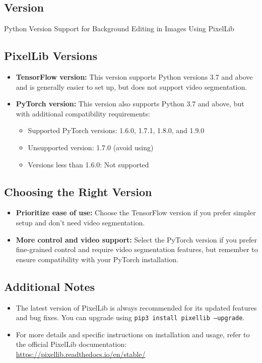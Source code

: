 \subsection{Version}
Python Version Support for Background Editing in Images Using PixelLib

\subsection*{PixelLib Versions}
\begin{itemize}[label=--]
    \item \textbf{TensorFlow version:} This version supports Python versions 3.7 and above and is generally easier to set up, but does not support video segmentation.
    \item \textbf{PyTorch version:} This version also supports Python 3.7 and above, but with additional compatibility requirements:
    \begin{itemize}[label=$\bullet$]
        \item Supported PyTorch versions: 1.6.0, 1.7.1, 1.8.0, and 1.9.0
        \item Unsupported version: 1.7.0 (avoid using)
        \item Versions less than 1.6.0: Not supported
    \end{itemize}
\end{itemize}

\subsection*{Choosing the Right Version}
\begin{itemize}[label=--]
    \item \textbf{Prioritize ease of use:} Choose the TensorFlow version if you prefer simpler setup and don't need video segmentation.
    \item \textbf{More control and video support:} Select the PyTorch version if you prefer fine-grained control and require video segmentation features, but remember to ensure compatibility with your PyTorch installation.
\end{itemize}

\subsection*{Additional Notes}
\begin{itemize}[label=--]
    \item The latest version of PixelLib is always recommended for its updated features and bug fixes. You can upgrade using \texttt{pip3 install pixellib --upgrade}.
    \item For more details and specific instructions on installation and usage, refer to the official PixelLib documentation: \url{https://pixellib.readthedocs.io/en/stable/}
\end{itemize}

